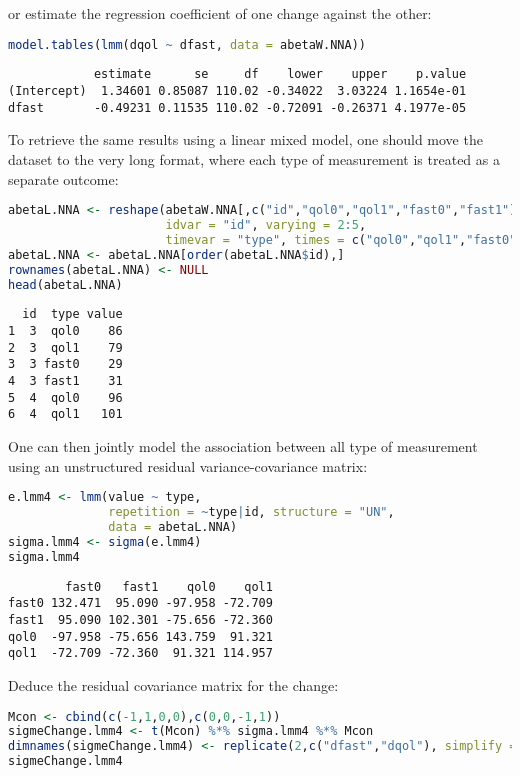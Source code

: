 \documentclass[12pt]{article}
\begin{document}
or estimate the regression coefficient of one change against the
other:
\begin{lstlisting}[language=r,numbers=none]
model.tables(lmm(dqol ~ dfast, data = abetaW.NNA))
\end{lstlisting}

\label{}
\begin{verbatim}
            estimate      se     df    lower    upper    p.value
(Intercept)  1.34601 0.85087 110.02 -0.34022  3.03224 1.1654e-01
dfast       -0.49231 0.11535 110.02 -0.72091 -0.26371 4.1977e-05
\end{verbatim}


To retrieve the same results using a linear mixed model, one should
move the dataset to the very long format, where each type of
measurement is treated as a separate outcome:
\begin{lstlisting}[language=r,numbers=none]
abetaL.NNA <- reshape(abetaW.NNA[,c("id","qol0","qol1","fast0","fast1")], direction = "long",
                      idvar = "id", varying = 2:5,
                      timevar = "type", times = c("qol0","qol1","fast0","fast1"), v.names = c("value"))
abetaL.NNA <- abetaL.NNA[order(abetaL.NNA$id),]
rownames(abetaL.NNA) <- NULL
head(abetaL.NNA)
\end{lstlisting}

\label{}
\begin{verbatim}
  id  type value
1  3  qol0    86
2  3  qol1    79
3  3 fast0    29
4  3 fast1    31
5  4  qol0    96
6  4  qol1   101
\end{verbatim}


One can then jointly model the association between all type of
measurement using an unstructured residual variance-covariance matrix:
\begin{lstlisting}[language=r,numbers=none]
e.lmm4 <- lmm(value ~ type,
              repetition = ~type|id, structure = "UN",
              data = abetaL.NNA)
sigma.lmm4 <- sigma(e.lmm4)
sigma.lmm4
\end{lstlisting}

\label{}
\begin{verbatim}
        fast0   fast1    qol0    qol1
fast0 132.471  95.090 -97.958 -72.709
fast1  95.090 102.301 -75.656 -72.360
qol0  -97.958 -75.656 143.759  91.321
qol1  -72.709 -72.360  91.321 114.957
\end{verbatim}


Deduce the residual covariance matrix for the change:
\begin{lstlisting}[language=r,numbers=none]
Mcon <- cbind(c(-1,1,0,0),c(0,0,-1,1))
sigmeChange.lmm4 <- t(Mcon) %*% sigma.lmm4 %*% Mcon
dimnames(sigmeChange.lmm4) <- replicate(2,c("dfast","dqol"), simplify = FALSE)
sigmeChange.lmm4
\end{lstlisting}
\end{document}
